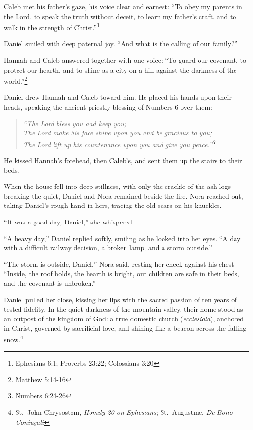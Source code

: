 \documentclass[11pt]{article}
\begin{document}
Caleb met his father's gaze, his voice clear and earnest: ``To obey my parents in the Lord, to speak the truth without deceit, to learn my father's craft, and to walk in the strength of Christ.''\footnote{Ephesians 6:1; Proverbs 23:22; Colossians 3:20}

Daniel smiled with deep paternal joy. ``And what is the calling of our family?''

Hannah and Caleb answered together with one voice: ``To guard our covenant, to protect our hearth, and to shine as a city on a hill against the darkness of the world.''\footnote{Matthew 5:14-16}

Daniel drew Hannah and Caleb toward him. He placed his hands upon their heads, speaking the ancient priestly blessing of Numbers 6 over them:
\begin{quote}
\textit{``The Lord bless you and keep you;\\
The Lord make his face shine upon you and be gracious to you;\\
The Lord lift up his countenance upon you and give you peace.''\footnote{Numbers 6:24-26}}
\end{quote}
He kissed Hannah's forehead, then Caleb's, and sent them up the stairs to their beds.

When the house fell into deep stillness, with only the crackle of the ash logs breaking the quiet, Daniel and Nora remained beside the fire. Nora reached out, taking Daniel's rough hand in hers, tracing the old scars on his knuckles.

``It was a good day, Daniel,'' she whispered.

``A heavy day,'' Daniel replied softly, smiling as he looked into her eyes. ``A day with a difficult railway decision, a broken lamp, and a storm outside.''

``The storm is outside, Daniel,'' Nora said, resting her cheek against his chest. ``Inside, the roof holds, the hearth is bright, our children are safe in their beds, and the covenant is unbroken.''

Daniel pulled her close, kissing her lips with the sacred passion of ten years of tested fidelity. In the quiet darkness of the mountain valley, their home stood as an outpost of the kingdom of God: a true domestic church (\textit{ecclesiola}), anchored in Christ, governed by sacrificial love, and shining like a beacon across the falling snow.\footnote{St.~John Chrysostom, \textit{Homily 20 on Ephesians}; St.~Augustine, \textit{De Bono Coniugali}}
\end{document}
